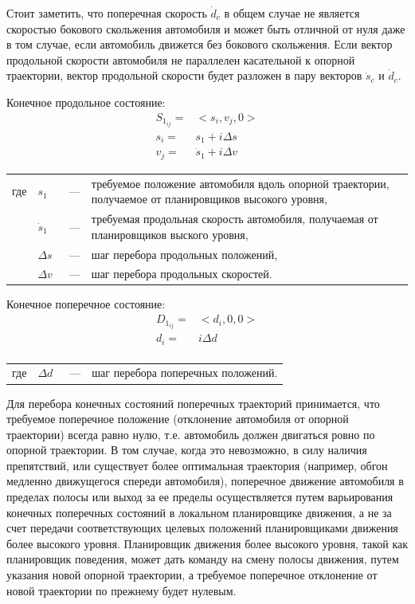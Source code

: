 Стоит заметить, что поперечная скорость $\dot{d}_c$ в общем случае не является скоростью бокового скольжения автомобиля
и может быть отличной от нуля даже в том случае, если автомобиль движется без бокового скольжения. Если вектор
продольной скорости автомобиля не параллелен касательной к опорной траектории, вектор продольной скорости будет разложен
в пару векторов $\dot{s}_c$ и $\dot{d}_c$.

Конечное продольное состояние:
\begin{equation}
      \begin{aligned}
            S_{1_{ij}} =& <s_i, v_j, 0> \\
            s_i =& s_1 + i\Delta s \\
            v_j =& \dot{s}_1 + i\Delta v
      \end{aligned}
\end{equation}
\noindent\begin{tabularx}{\linewidth}{lllX}
      где & $s_1$       &~---& требуемое положение автомобиля вдоль опорной траектории, получаемое от планировщиков высокого уровня, \\
          & $\dot{s}_1$ &~---& требуемая продольная скорость автомобиля, получаемая от планировщиков выского уровня, \\
          & $\Delta s$  &~---& шаг перебора продольных положений, \\
          & $\Delta v$  &~---& шаг перебора продольных скоростей.
\end{tabularx}

Конечное поперечное состояние:
\begin{equation}
      \begin{aligned}
            D_{1_{ij}} =& <d_i, 0, 0> \\
            d_i =& i\Delta d \\
      \end{aligned}
\end{equation}
\noindent\begin{tabularx}{\linewidth}{lllX}
      где & $\Delta d$  &~---& шаг перебора поперечных положений.
\end{tabularx}

Для перебора конечных состояний поперечных траекторий принимается, что требуемое поперечное положение (отклонение
автомобиля от опорной траектории) всегда равно нулю, т.е. автомобиль должен двигаться ровно по опорной траектории.
В том случае, когда это невозможно, в силу наличия препятствий, или существует более оптимальная траектория (например,
обгон медленно движущегося спереди автомобиля), поперечное движение автомобиля в пределах полосы или выход за ее пределы
осуществляется путем варьирования конечных поперечных состояний в локальном планировщике движения, а не за счет передачи
соответствующих целевых положений планировщиками движения более высокого уровня. Планировщик движения более
высокого уровня, такой как планировщик поведения, может дать команду на смену полосы движения, путем указания
новой опорной траектории, а требуемое  поперечное отклонение от новой траектории по прежнему будет нулевым.

